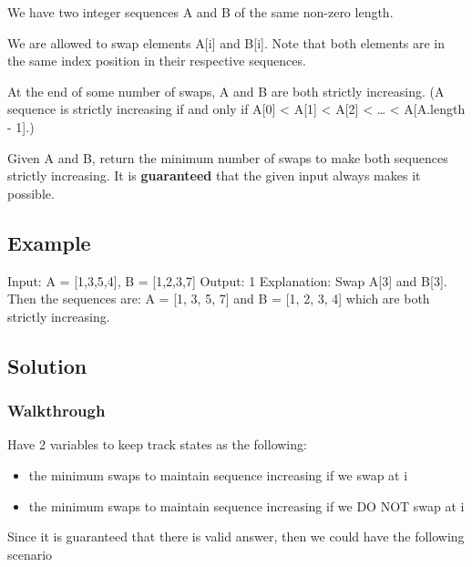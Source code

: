 \documentclass[]{book}
\begin{document}
We have two integer sequences A and B of the same non-zero length.

We are allowed to swap elements A{[}i{]} and B{[}i{]}. Note that both elements are in the same index position in their
respective sequences.

At the end of some number of swaps, A and B are both strictly increasing. (A sequence is strictly increasing
if and only if A{[}0{]} \textless{} A{[}1{]} \textless{} A{[}2{]} \textless{} \ldots{} \textless{} A{[}A.length - 1{]}.)

Given A and B, return the minimum number of swaps to make both sequences strictly increasing. It is
\textbf{guaranteed} that the given input always makes it possible.

\hypertarget{example-35}{%
\subsection{Example}\label{example-35}}

Input: A = {[}1,3,5,4{]}, B = {[}1,2,3,7{]} Output: 1
Explanation:
Swap A{[}3{]} and B{[}3{]}. Then the sequences are: A = {[}1, 3, 5, 7{]} and B = {[}1, 2, 3, 4{]} which are both strictly
increasing.

\hypertarget{solution-29}{%
\subsection{Solution}\label{solution-29}}

\hypertarget{walkthrough-35}{%
\subsubsection{Walkthrough}\label{walkthrough-35}}

Have 2 variables to keep track states as the following:

\begin{itemize}
    \item the minimum swaps to maintain sequence increasing if we swap at i
    \item the minimum swaps to maintain sequence increasing if we DO NOT swap at i
\end{itemize}

Since it is guaranteed that there is valid answer, then we could have the following scenario
\end{document}
